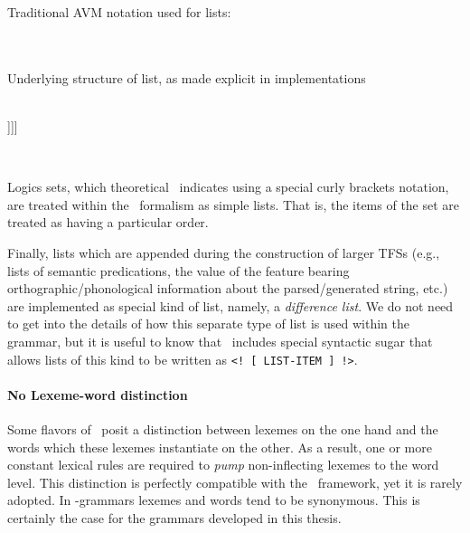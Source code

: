 \begin{exe}
    \ex\begin{xlist}
        \ex Traditional AVM notation used for lists:\\\\
            \begin{avm}
            \end{avm}\\
        \ex Underlying structure of list, as made explicit in
                 implementations\\\\
            \begin{avm}
                [ fruits & [ first & \textnormal{`oranges'}\\
                             rest & [ first & \textnormal{`bananas'} \\
                                      rest & [ first & \textnormal{`apples'} \\
                                               rest & *end* ]]]]
            \end{avm}\\
    \end{xlist}
\end{exe}

Logics sets, which theoretical \hpsg\ indicates using a special curly brackets
notation, are treated within the \delphin\ formalism as simple lists. That is,
the items of the set are treated as having a particular order.

Finally, lists which are appended during the construction of larger TFSs (e.g.,
lists of semantic predications, the value of the feature bearing
orthographic/phonological information about the parsed/generated string, etc.)
are implemented as special kind of list, namely, a \emph{difference list}. We
do not need to get into the details of how this separate type of list is used
within the grammar, but it is useful to know that \tdl\ includes special
syntactic sugar that allows lists of this kind to be written as \texttt{<! [
LIST-ITEM ] !>}.

\paragraph{No Lexeme-word distinction}

Some flavors of \hpsg\ posit a distinction between lexemes on the one hand and
the words which these lexemes instantiate on the other. As a result, one or
more constant lexical rules are required to \emph{pump} non-inflecting lexemes
to the word level. This distinction is perfectly compatible with the \delphin\
framework, yet it is rarely adopted. In \delphin-grammars lexemes and words
tend to be synonymous. This is certainly the case for the grammars developed in
this thesis.

